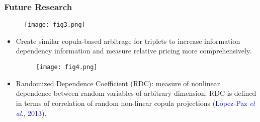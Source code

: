 \documentclass[pdf,9pt,xcolor=dvipsnames,hide notes]{beamer}
\begin{document}
%		
%			
%	
%



\begin{frame}
	\frametitle{Future Research}
	
	\begin{figure}[htbp]
		\centering
		\texttt{[image: fig3.png]}
		\label{fig:fig3}
	\end{figure}

\begin{itemize}
	\item Create similar copula-based arbitrage for triplets to increase information dependency information and measure relative pricing more comprehensively.
	
		\begin{figure}[htbp]
		\centering
		\texttt{[image: fig4.png]}
		\label{fig:fig4}
	\end{figure}
	
	\vspace{0.3cm}
	
	\item Randomized Dependence Coefficient (RDC): measure of nonlinear dependence between random variables of arbitrary dimension. RDC is defined in terms of correlation of random non-linear copula projections (\textcolor{blue}{Lopez-Paz \emph{et al}}., \textcolor{blue}{2013}).
	
\end{itemize}
	
\end{frame}
\end{document}
